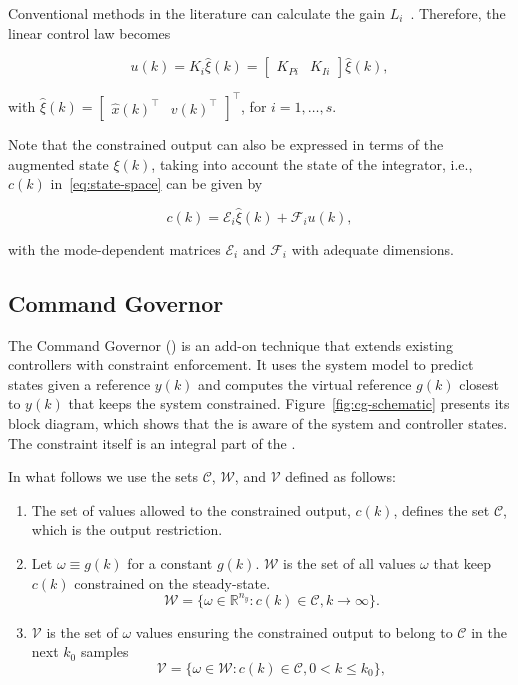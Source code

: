 Conventional methods in the literature can calculate the gain
\(L_i\)~\parencite{chen:linear,hespanha:linear}. Therefore, the linear control
law becomes

\begin{equation}
  \label{eq:control-law}
  u(k)= K_i \hat{\xi}(k) = \begin{bmatrix}K_{Pi} & K_{Ii} \end{bmatrix}
  \hat{\xi}(k),
\end{equation}

with \(\hat{\xi}(k) = \begin{bmatrix}\hat{x}{(k)}^\top & v{(k)}^\top
\end{bmatrix}^\top{}\), for \(i=1,\ldots,s\).

Note that the constrained output can also be expressed in terms of the augmented
state \(\xi(k)\), taking into account the state of the integrator, i.e., \(c(k)\)
in~\eqref{eq:state-space} can be given by

\begin{equation}
  \label{eq:constrained-output}
  c(k) = \mathcal{E}_i\hat{\xi}(k) + \mathcal{F}_i u(k),
\end{equation}

with the mode-dependent matrices \(\mathcal{E}_i\) and \(\mathcal{F}_i\) with
adequate dimensions.

\subsection{Command Governor}%
\label{subsec:cg}

The Command Governor (\CG{}) is an add-on technique that extends existing
controllers with constraint enforcement. It uses the system model to predict
states given a reference \(y(k)\) and computes the virtual reference \(g(k)\)
closest to \(y(k)\) that keeps the system constrained.
Figure~\ref{fig:cg-schematic} presents its block diagram, which shows that the
\CG{} is aware of the system and controller states. The constraint itself is an
integral part of the \CG{}.\



In what follows we use the sets \(\mathcal{C}\), \(\mathcal{W}\), and
\(\mathcal{V}\) defined as follows:

\begin{enumerate}
  \item The set of values allowed to the constrained output, \(c(k)\), defines
        the set \(\mathcal{C}\), which is the output restriction.
  \item Let \(\omega\equiv g(k)\) for a constant \(g(k)\). \(\mathcal{W}\) is the set of
        all values \(\omega{}\) that keep \(c(k)\) constrained on the steady-state.
        \[\mathcal{W} = \{\omega\in\mathbb{R}^{n_y}:
          c(k)\in\mathcal{C},k\rightarrow\infty{}\}.\]
  \item \(\mathcal{V}\) is the set of \(\omega{}\) values ensuring the constrained
        output to belong to \(\mathcal{C}\) in the next \(k_0\) samples
        \[
          \mathcal{V}=\{\omega\in\mathcal{W}:c(k)\in\mathcal{C},0<k\leq{}k_0\},
        \]
\end{enumerate}

